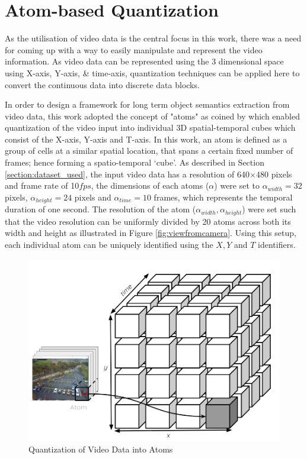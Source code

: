\section{Atom-based Quantization}
\label{section:atoms}

As the utilisation of video data is the central focus in this work, there was a need for coming up with a way to easily manipulate and represent the video information. As video data can be  represented using the 3 dimensional space using X-axis, Y-axis, \& time-axis, quantization techniques can be applied here to convert the continuous data into discrete data blocks.     

In order to design a framework for long term object semantics extraction from video data, this work adopted the concept of "atoms" as coined by \cite{castanon2016retrieval} which enabled quantization of the video input into individual 3D spatial-temporal cubes which consist of the X-axis, Y-axis and T-axis. In this work, an atom is defined as a group of cells at a similar spatial location, that spans a certain fixed number of frames; hence forming a spatio-temporal `cube'.
As described in Section \ref{section:dataset_used}, the input video data has a resolution of 640$\times$480 pixels and frame rate of 10$fps$, the dimensions of each atoms ($\alpha$) were 
set to $\alpha_{width}=32$ pixels, $\alpha_{height}=24$ pixels and $\alpha_{time}=10$ frames, which represents the temporal duration of one second. The resolution of the atom ($\alpha_{width},\alpha_{height}$) were set such that the video resolution can be uniformly divided by 20 atoms across both its width and height as illustrated in Figure \ref{fig:viewfromcamera}. Using this setup, each individual atom can be uniquely identified using the $X, Y$ and $T$ identifiers. 



\begin{figure}[hbt!]\centering
\includegraphics[width=.7\textwidth]{image/general/atom.PNG}
\caption{Quantization of Video Data into Atoms}
\label{fig:atoms}
\end{figure}

